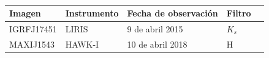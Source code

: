 \begin{table}[t]
\begin{tabular}{@{}lllllllllll@{}}
\end{tabular}
\end{table}


\begin{table}[t]
\caption{}
\label{tab:estrellas2}
\begin{tabular}{@{}lllll@{}}
\toprule
Imagen     & Instrumento & Fecha de observación & Filtro &  \\ \midrule
IGRFJ17451 & LIRIS       & 9 de abril 2015      & $K_s$   &  \\
MAXIJ1543  & HAWK-I      & 10 de abril 2018     & H      &  \\ \bottomrule
\end{tabular}
\end{table}